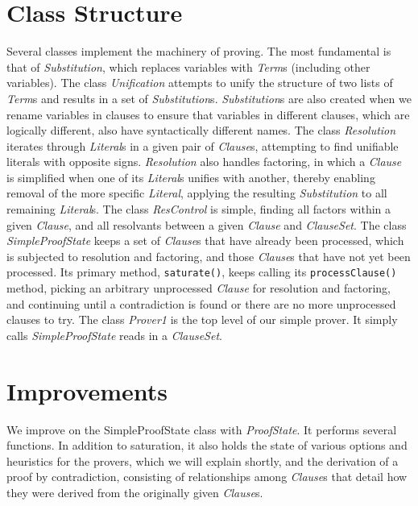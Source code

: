 \documentclass{llncs}
\begin{document}
\section{Class Structure}

Several classes implement the machinery of proving.  The most
fundamental is that of \emph{Substitution}, which replaces variables with
\emph{Term}s (including other variables).  The class \emph{Unification} attempts to
unify the structure of two lists of \emph{Term}s and results in a set of
\emph{Substitution}s.  \emph{Substitution}s are also created when we rename
variables in clauses to ensure that variables in different clauses,
which are logically different, also have syntactically different
names.  The class \emph{Resolution} iterates through \emph{Literal}s in a given pair
of \emph{Clause}s, attempting to find unifiable literals with opposite signs.
\emph{Resolution} also handles factoring, in which a \emph{Clause} is simplified
when one of its \emph{Literal}s unifies with another, thereby enabling
removal of the more specific \emph{Literal}, applying the resulting
\emph{Substitution} to all remaining \emph{Literal}s.  The class \emph{ResControl} is
simple, finding all factors within a given \emph{Clause}, and all resolvants
between a given \emph{Clause} and \emph{ClauseSet}.  The class \emph{SimpleProofState}
keeps a set of \emph{Clause}s that have already been processed, which is
subjected to resolution and factoring, and those \emph{Clause}s that have not
yet been processed.  Its primary method, \texttt{saturate()}, keeps calling its
\texttt{processClause()} method, picking an arbitrary unprocessed \emph{Clause} for
resolution and factoring, and continuing until a contradiction is
found or there are no more unprocessed clauses to try.  The class
\emph{Prover1} is the top level of our simple prover.  It simply calls
\emph{SimpleProofState} reads in a \emph{ClauseSet}.

\section{Improvements}

We improve on the SimpleProofState class with \emph{ProofState}. It performs
several functions.  In addition to saturation, it also holds the state
of various options and heuristics for the provers, which we will
explain shortly, and the derivation of a proof by contradiction,
consisting of relationships among \emph{Clause}s that detail how they were
derived from the originally given \emph{Clause}s.
\end{document}

